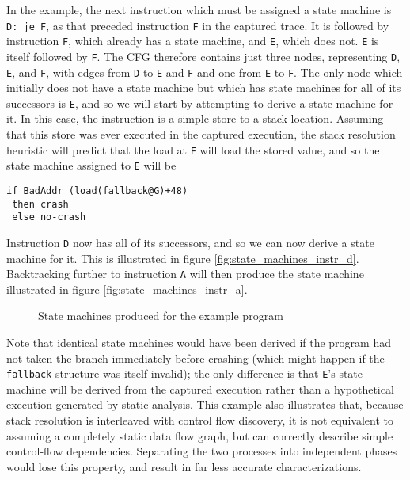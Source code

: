 \documentclass[10pt,twocolumn,preprint,natbib,authoryear]{sigplanconf}
\begin{document}
In the example, the next instruction which must be assigned a state
machine is \verb|D: je F|, as that preceded instruction \verb|F| in
the captured trace.  It is followed by instruction \verb|F|, which
already has a state machine, and \verb|E|, which does not.  \verb|E|
is itself followed by \verb|F|.  The CFG therefore contains just three
nodes, representing \verb|D|, \verb|E|, and \verb|F|, with edges from
\verb|D| to \verb|E| and \verb|F| and one from \verb|E| to \verb|F|.
The only node which initially does not have a state machine but which
has state machines for all of its successors is \verb|E|, and so we
will start by attempting to derive a state machine for it.  In this
case, the instruction is a simple store to a stack location.  Assuming
that this store was ever executed in the captured execution, the stack
resolution heuristic will predict that the load at \verb|F| will load
the stored value, and so the state machine assigned to \verb|E| will
be

\begin{verbatim}
if BadAddr (load(fallback@G)+48)
 then crash
 else no-crash
\end{verbatim}

Instruction \verb|D| now has all of its successors, and so we can now
derive a state machine for it.  This is illustrated in figure
\ref{fig:state_machines_instr_d}.  Backtracking further to instruction
\verb|A| will then produce the state machine illustrated in figure
\ref{fig:state_machines_instr_a}.

\begin{figure*}
\caption{State machines produced for the example program}
\end{figure*}

Note that identical state machines would have been derived if the
program had not taken the branch immediately before crashing (which
might happen if the \verb|fallback| structure was itself invalid); the
only difference is that \verb|E|'s state machine will be derived from
the captured execution rather than a hypothetical execution generated
by static analysis.  This example also illustrates that, because stack
resolution is interleaved with control flow discovery, it is not
equivalent to assuming a completely static data flow graph, but can
correctly describe simple control-flow dependencies.  Separating the
two processes into independent phases would lose this property, and
result in far less accurate characterizations.
\end{document}
